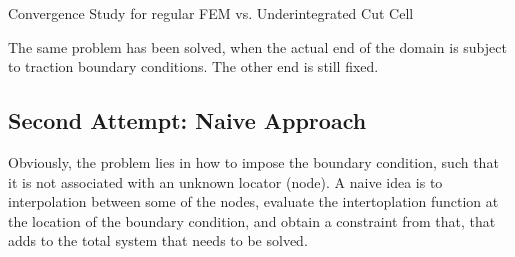 \documentclass[a4paper,12pt]{article}
\makeatletter
\newenvironment{figurehere}
  {\def\@captype{figure}}
  {}
\makeatother
\begin{document}
\begin{center}
\begin{figurehere}
\caption{Convergence Study for regular FEM vs. Underintegrated Cut Cell}\label{fig:underintegrationdispbc}
\end{figurehere}
\end{center}
The same problem has been solved, when the actual end of the domain is subject to traction boundary conditions. The other end is still fixed.
\subsection{Second Attempt: Naive Approach}\label{sec:naiveApproach}
Obviously, the problem lies in how to impose the boundary condition, such that it is not associated with an unknown locator (node). A naive idea is to interpolation between some of the nodes, evaluate the intertoplation function at the location of the boundary condition, and obtain a constraint from that, that adds to the total system that needs to be solved.
\end{document}
